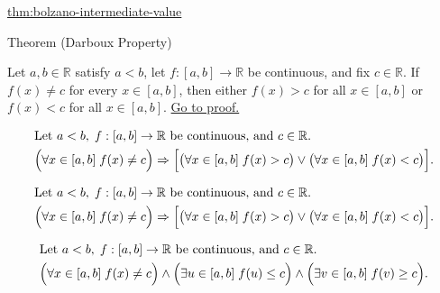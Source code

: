 \begin{dependencies}
\hyperref[thm:bolzano-intermediate-value]{thm:bolzano-intermediate-value}
\end{dependencies}


\begin{theorembox}{Theorem (Darboux Property)}
\begin{theorem}
\label{thm:darboux-property}
Let $a,b\in\mathbb{R}$ satisfy $a<b$, let $f:[a,b]\to\mathbb{R}$ be continuous, and fix $c\in\mathbb{R}$. If $f(x)\neq c$ for every $x\in[a,b]$, then either $f(x)>c$ for all $x\in[a,b]$ or $f(x)<c$ for all $x\in[a,b]$.
\hyperref[prf:darboux-property]{Go to proof.}
\end{theorem}
\end{theorembox}

\begin{remark*}
\[
\begin{aligned}
&\text{Let } a<b,\; f:[a,b]\to\mathbb{R} \text{ be continuous, and } c\in\mathbb{R}.\\
&\Bigl(\forall x\in[a,b]\; f(x)\neq c\Bigr)
\Rightarrow
\Bigl[\bigl(\forall x\in[a,b]\; f(x)>c\bigr)\lor\bigl(\forall x\in[a,b]\; f(x)<c\bigr)\Bigr].
\end{aligned}
\]
\end{remark*}

\begin{remark*}
\[
\begin{aligned}
&\text{Let } a<b,\; f:[a,b]\to\mathbb{R} \text{ be continuous, and } c\in\mathbb{R}.\\
&\Bigl(\forall x\in[a,b]\; f(x)\neq c\Bigr)
\Rightarrow
\Bigl[\bigl(\forall x\in[a,b]\; f(x)>c\bigr)\lor\bigl(\forall x\in[a,b]\; f(x)<c\bigr)\Bigr].
\end{aligned}
\]
\end{remark*}

\begin{remark*}
\[
\begin{aligned}
&\text{Let } a<b,\; f:[a,b]\to\mathbb{R} \text{ be continuous, and } c\in\mathbb{R}.\\
&\Bigl(\forall x\in[a,b]\; f(x)\neq c\Bigr)
\land
\Bigl(\exists u\in[a,b]\; f(u)\le c\Bigr)
\land
\Bigl(\exists v\in[a,b]\; f(v)\ge c\Bigr).
\end{aligned}
\]
\end{remark*}

